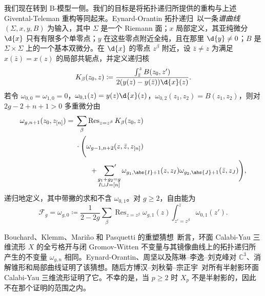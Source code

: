 \documentclass{amsart}
\theoremstyle{definition}
\theoremstyle{remark}
\theoremstyle{plain}
\theoremstyle{definition}
\theoremstyle{remark}
\newcommand{\C}{\mathbb{C}}
\newcommand{\mc}[1]{\mathcal{#1}}
\newcommand{\on}[1]{\operatorname{#1}}
\newcommand{\1}{\mathbf{1}}
\newcommand{\2}{\mathbf{2}}
\newcommand{\3}{\mathbf{3}}
\begin{document}
我们现在转到 B-模型一侧。我们的目标是将拓扑递归所提供的重构与上述 Givental-Teleman 重构等同起来。Eynard-Orantin 拓扑递归~\cite{EO2007}以一条\textit{谱曲线} \((\Sigma,x,y,B)\) 为输入，其中 \(\Sigma\) 是一个 Riemann 面；\(x\) 局部定义，其亚纯微分 \(\d{x}\) 只有有限多个单零点；\(y\) 在这些零点附近全纯，且在那里 \(\d{y} \neq 0\)；\(B\) 是 \(\Sigma \times \Sigma\) 上的一个基本双微分。在 \(\d{x}\) 的零点 \(z^{\beta}\) 附近，设 \(\bar{z} \neq z\) 为满足 \(x(\bar{z}) = x(z)\) 的局部共轭点，并定义递归核
\[ K_{\beta}(z_0,z) \coloneqq \frac{\int_{\bar{z}}^z B(z_0,z')}{2(y(z)-y(\bar{z}))\d{x}(z)}. \]
若令 \(\omega_{0,0} = \omega_{1,0} = 0\)，\(\omega_{0,1}(z) = y(z)\d{x}(z)\)，\(\omega_{0,2}(z_1,z_2) = B(z_1,z_2)\)，则对 \(2g-2+n+1 > 0\) 多重微分由
\begin{align*}
    \omega_{g,n+1}(z_0,z_{[n]}) ={}& \sum_{\beta}\on{Res}_{z = z^{\beta}} K_{\beta}(z_0,z) \\
    &\cdot \Bigg( \omega_{g-1,n+2}(z,\bar{z},z_{[n]}) \\
    &\qquad + \sideset{}{'}\sum_{\substack{g_1+g_2 = g \\ I \sqcup J = [n]}}\omega_{g_1,\abs{I}+1}(z,z_I)\omega_{g_2,\abs{J}+1}(\bar{z},z_J)\Bigg),
\end{align*}
递归地定义，其中带撇的求和不含 \(\omega_{0,1}\)。对 \(g \geq 2\)，自由能为
\[ \mc{F}_g = \omega_{g,0} \coloneqq \frac{1}{2-2g}\sum_{\beta}\on{Res}_{z=z^{\beta}}\omega_{g,1}(z)\int_{z'=z^{\beta}}^z \omega_{0,1}(z'). \]

Bouchard、Klemm、Mari\~{n}o 和 Pasquetti 的重塑猜想~\cite{BKMP2009}断言，环面 Calabi-Yau 三维流形 \(X\) 的全亏格开与闭 Gromov-Witten 不变量与其镜像曲线上的拓扑递归所产生的不变量 \(\omega_{g,n}\) 相同。Eynard-Orantin、周坚以及陈琳–李逸–刘克峰对 \(\C^3\)、消解锥形和局部曲线证明了该猜想。随后方博汉–刘秋菊–宗正宇~\cite{FLZ2020}对所有半射影环面 Calabi-Yau 三维流形证明了它。不幸的是，当 \(p \geq 2\) 时 \(X_p\) 不是半射影的，因此不在那个证明的范围之内。
\end{document}
